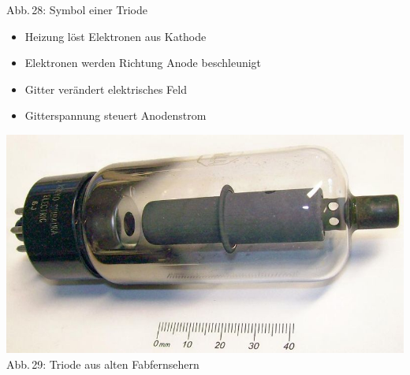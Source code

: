 \begin{frame}
\begin{minipage}{0.3\textwidth}
    {\tiny Abb.\,28: Symbol einer Triode~\cite{wp}}
  \end{minipage}
  \hspace{0.5cm}
  \begin{minipage}{0.5\textwidth}
    \begin{small}
      \begin{itemize}
        \item Heizung löst Elektronen aus Kathode
        \item Elektronen werden Richtung Anode beschleunigt
        \item Gitter verändert elektrisches Feld
        \item Gitterspannung steuert Anodenstrom
      \end{itemize}
    \end{small}
    \begin{center}
      \includegraphics[scale=0.4 ]{a06/Triode.jpg}\\
      {\tiny Abb.\,29: Triode aus alten Fabfernsehern~\cite{wp}}
    \end{center}
  \end{minipage}
\end{frame}


